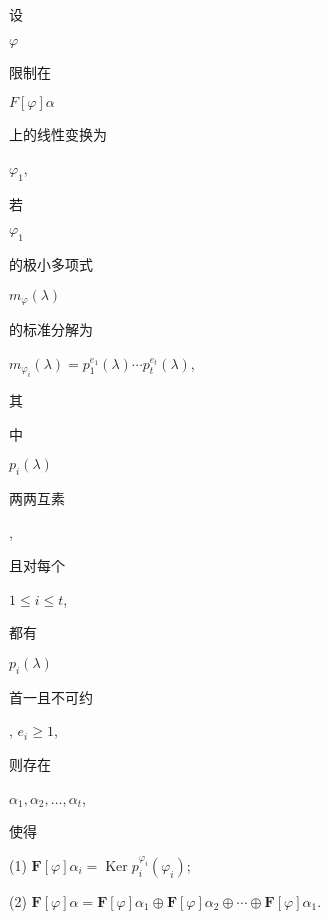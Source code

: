\documentclass[10pt]{article}
\begin{document}
\begin{CJK}{UTF8}{mj}设\end{CJK} $\varphi$ \begin{CJK}{UTF8}{mj}限制在\end{CJK} $F[\varphi] \alpha$ \begin{CJK}{UTF8}{mj}上的线性变换为\end{CJK} $\varphi_{1}$, \begin{CJK}{UTF8}{mj}若\end{CJK} $\varphi_{1}$ \begin{CJK}{UTF8}{mj}的极小多项式\end{CJK} $m_{\varphi}(\lambda)$ \begin{CJK}{UTF8}{mj}的标准分解为\end{CJK} $m_{\varphi_{i}}(\lambda)=p_{1}^{e_{1}}(\lambda) \cdots p_{t}^{e_{t}}(\lambda)$, \begin{CJK}{UTF8}{mj}其\end{CJK} \begin{CJK}{UTF8}{mj}中\end{CJK} $p_{i}(\lambda)$ \begin{CJK}{UTF8}{mj}两两互素\end{CJK}, \begin{CJK}{UTF8}{mj}且对每个\end{CJK} $1 \leq i \leq t$, \begin{CJK}{UTF8}{mj}都有\end{CJK} $p_{i}(\lambda)$ \begin{CJK}{UTF8}{mj}首一且不可约\end{CJK}, $e_{i} \geq 1$, \begin{CJK}{UTF8}{mj}则存在\end{CJK} $\alpha_{1}, \alpha_{2}, \ldots, \alpha_{t}$, \begin{CJK}{UTF8}{mj}使得\end{CJK}

(1) $\boldsymbol{F}[\varphi] \alpha_{i}=\operatorname{Ker} p_{i}^{\varphi_{i}}\left(\varphi_{i}\right)$;

(2) $\boldsymbol{F}[\varphi] \alpha=\boldsymbol{F}[\varphi] \alpha_{1} \oplus \boldsymbol{F}[\varphi] \alpha_{2} \oplus \cdots \oplus \boldsymbol{F}[\varphi] \alpha_{1}$.
\end{document}
